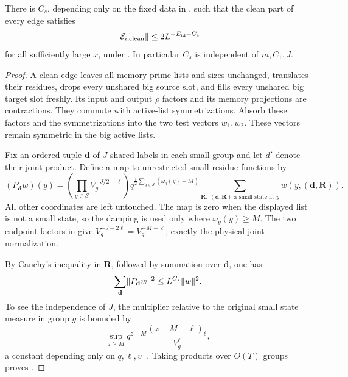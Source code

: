 \begin{lemma}\label{lem:clean-norm}
There is $C_s$, depending only on the fixed data in
, such that the clean part of every
edge satisfies
\begin{equation}\label{eq:clean-norm}
 \lVert \mathcal E_{i,\rm clean}\rVert
 \le 2L^{-E_{\rm id}+C_s}
\end{equation}
for all sufficiently large $x$, under
.  In particular $C_s$ is
independent of $m,C_1,J$.
\end{lemma}

\begin{proof}
A clean edge leaves all memory prime lists and sizes
unchanged, translates their residues, drops every unshared
big source slot, and fills every unshared big target slot
freshly.  Its input and output $\rho$ factors and its
memory projections are contractions.  They commute with
active-list symmetrizations.  Absorb these factors and the
symmetrizations into the two test vectors $w_1,w_2$.
These vectors remain symmetric in the big active lists.

Fix an ordered tuple $\mathbf d$ of $J$ shared labels in
each small group and let $d'$ denote their joint product.
Define a map to unrestricted small residue functions by
\begin{equation}\label{eq:small-conditioning-map}
 (P_{\mathbf d}w)(y)=
 \left(\prod_{g\in\mathcal S}V_g^{-J/2-\ell}\right)
 q^{\frac12\sum_{g\in\mathcal S}(\omega_g(y)-M)}
 \sum_{\mathbf R:\ (\mathbf d,\mathbf R)\text{ a small state at }y}
             w(y,(\mathbf d,\mathbf R)).
\end{equation}
All other coordinates are left untouched.  The map is zero
when the displayed list is not a small state, so the damping
is used only where $\omega_g(y)\ge M$.  The two endpoint
factors in  give
$V_g^{-J-2\ell}=V_g^{-M-\ell}$, exactly the physical joint
normalization.

By Cauchy's inequality in $\mathbf R$, followed by summation
over $\mathbf d$, one has
\begin{equation}\label{eq:small-map-norm}
 \sum_{\mathbf d}\lVert P_{\mathbf d}w\rVert^2
 \le L^{C_s}\lVert w\rVert^2.
\end{equation}
To see the independence of $J$, the multiplier relative to
the original small state measure in group $g$ is bounded by
\[
 \sup_{z\ge M}
 q^{z-M}\frac{(z-M+\ell)_\ell}{V_g^\ell},
\]
a constant depending only on $q,\ell,v_-$.  Taking products
over $O(T)$ groups proves .


\end{proof}
